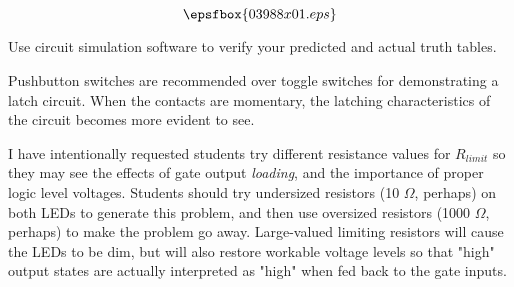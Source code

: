 

$$\epsfbox{03988x01.eps}$$

\vfil \eject






Use circuit simulation software to verify your predicted and actual truth tables.







Pushbutton switches are recommended over toggle switches for demonstrating a latch circuit.  When the contacts are momentary, the latching characteristics of the circuit becomes more evident to see.

I have intentionally requested students try different resistance values for $R_{limit}$ so they may see the effects of gate output {\it loading}, and the importance of proper logic level voltages.  Students should try undersized resistors (10 $\Omega$, perhaps) on both LEDs to generate this problem, and then use oversized resistors (1000 $\Omega$, perhaps) to make the problem go away.  Large-valued limiting resistors will cause the LEDs to be dim, but will also restore workable voltage levels so that "high" output states are actually interpreted as "high" when fed back to the gate inputs.




